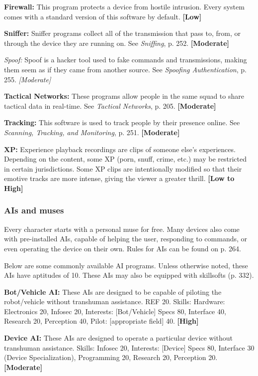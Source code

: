 \textbf{Firewall:} This program protects a device from hostile intrusion. Every system comes with a standard version of this software by default. \textbf{[Low]}

\textbf{Sniffer:} Sniffer programs collect all of the transmission that pass to, from, or through the device they are running on. See \emph{Sniffing}, p. 252. \textbf{[Moderate]}

\emph{Spoof:} Spoof is a hacker tool used to fake commands and transmissions, making them seem as if they came from another source. See \emph{Spoofing Authentication}, p. 255. \emph{[Moderate]}

\textbf{Tactical Networks:} These programs allow people in the same squad to share tactical data in real-time. See \emph{Tactical Networks}, p. 205. \textbf{[Moderate]}

\textbf{Tracking:} This software is used to track people by their presence online. See \emph{Scanning, Tracking, and Monitoring}, p. 251. \textbf{[Moderate]}

\textbf{XP:} Experience playback recordings are clips of someone else’s experiences. Depending on the content, some XP (porn, snuff, crime, etc.) may be restricted in certain jurisdictions. Some XP clips are intentionally modified so that their emotive tracks are more intense, giving the viewer a greater thrill. \textbf{[Low to High]}

\subsubsection{AIs and muses}

Every character starts with a personal muse for free. Many devices also come with pre-installed AIs, capable of helping the user, responding to commands, or even operating the device on their own. Rules for AIs can be found on p. 264.

Below are some commonly available AI programs. Unless otherwise noted, these AIs have aptitudes of 10. These AIs may also be equipped with skillsofts (p. 332).

\textbf{Bot/Vehicle AI:} These AIs are designed to be capable of piloting the robot/vehicle without transhuman assistance. REF 20. Skills: Hardware: Electronics 20, Infosec 20, Interests: [Bot/Vehicle] Specs 80, Interface 40, Research 20, Perception 40, Pilot: [appropriate field] 40. \textbf{[High]}

\textbf{Device AI:} These AIs are designed to operate a particular device without transhuman assistance. Skills: Infosec 20, Interests: [Device] Specs 80, Interface 30 (Device Specialization), Programming 20, Research 20, Perception 20. \textbf{[Moderate]}

